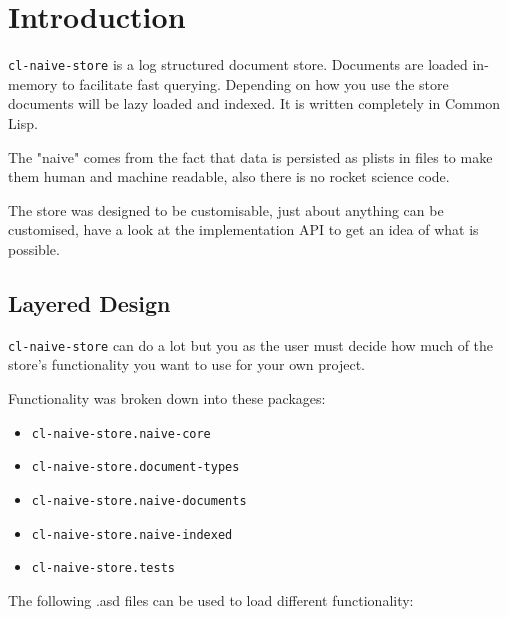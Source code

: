 \documentclass[11pt]{article}
\author{Phil}
\date{\today}
\title{}
\begin{document}
\tableofcontents

\section{Introduction}
\label{sec:org02392f9}

\texttt{cl-naive-store} is a log structured document store. Documents are
loaded in-memory to facilitate fast querying. Depending on how you use
the store documents will be lazy loaded and indexed. It is written
completely in Common Lisp.

The "naive" comes from the fact that data is persisted
as plists in files to make them human and machine readable, also there
is no rocket science code.

The store was designed to be customisable, just about anything can be
customised, have a look at the implementation API to get an idea of
what is possible.

\subsection{Layered Design}
\label{sec:orgd392736}

\texttt{cl-naive-store} can do a lot but you as the user must decide how much
of the store's functionality you want to use for your own project.

Functionality was broken down into these packages:

\begin{itemize}
\item \texttt{cl-naive-store.naive-core}
\item \texttt{cl-naive-store.document-types}
\item \texttt{cl-naive-store.naive-documents}
\item \texttt{cl-naive-store.naive-indexed}
\item \texttt{cl-naive-store.tests}
\end{itemize}

The following .asd files can be used to load different functionality:
\end{document}
